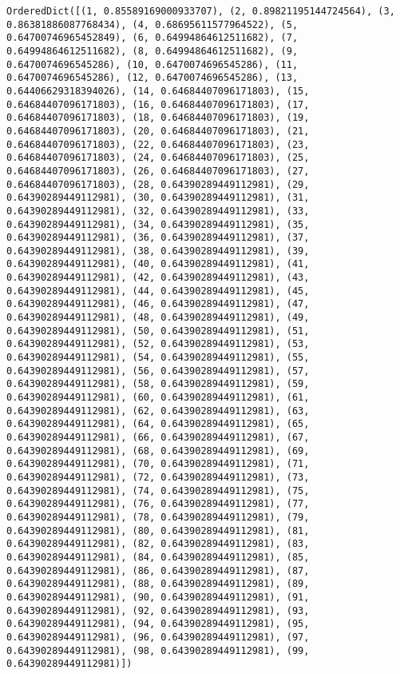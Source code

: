\documentclass[11pt]{article}
\begin{document}
\begin{Verbatim}[commandchars=\\\{\}]
OrderedDict([(1, 0.85589169000933707), (2, 0.89821195144724564), (3, 0.86381886087768434), (4, 0.68695611577964522), (5, 0.64700746965452849), (6, 0.64994864612511682), (7, 0.64994864612511682), (8, 0.64994864612511682), (9, 0.6470074696545286), (10, 0.6470074696545286), (11, 0.6470074696545286), (12, 0.6470074696545286), (13, 0.64406629318394026), (14, 0.64684407096171803), (15, 0.64684407096171803), (16, 0.64684407096171803), (17, 0.64684407096171803), (18, 0.64684407096171803), (19, 0.64684407096171803), (20, 0.64684407096171803), (21, 0.64684407096171803), (22, 0.64684407096171803), (23, 0.64684407096171803), (24, 0.64684407096171803), (25, 0.64684407096171803), (26, 0.64684407096171803), (27, 0.64684407096171803), (28, 0.64390289449112981), (29, 0.64390289449112981), (30, 0.64390289449112981), (31, 0.64390289449112981), (32, 0.64390289449112981), (33, 0.64390289449112981), (34, 0.64390289449112981), (35, 0.64390289449112981), (36, 0.64390289449112981), (37, 0.64390289449112981), (38, 0.64390289449112981), (39, 0.64390289449112981), (40, 0.64390289449112981), (41, 0.64390289449112981), (42, 0.64390289449112981), (43, 0.64390289449112981), (44, 0.64390289449112981), (45, 0.64390289449112981), (46, 0.64390289449112981), (47, 0.64390289449112981), (48, 0.64390289449112981), (49, 0.64390289449112981), (50, 0.64390289449112981), (51, 0.64390289449112981), (52, 0.64390289449112981), (53, 0.64390289449112981), (54, 0.64390289449112981), (55, 0.64390289449112981), (56, 0.64390289449112981), (57, 0.64390289449112981), (58, 0.64390289449112981), (59, 0.64390289449112981), (60, 0.64390289449112981), (61, 0.64390289449112981), (62, 0.64390289449112981), (63, 0.64390289449112981), (64, 0.64390289449112981), (65, 0.64390289449112981), (66, 0.64390289449112981), (67, 0.64390289449112981), (68, 0.64390289449112981), (69, 0.64390289449112981), (70, 0.64390289449112981), (71, 0.64390289449112981), (72, 0.64390289449112981), (73, 0.64390289449112981), (74, 0.64390289449112981), (75, 0.64390289449112981), (76, 0.64390289449112981), (77, 0.64390289449112981), (78, 0.64390289449112981), (79, 0.64390289449112981), (80, 0.64390289449112981), (81, 0.64390289449112981), (82, 0.64390289449112981), (83, 0.64390289449112981), (84, 0.64390289449112981), (85, 0.64390289449112981), (86, 0.64390289449112981), (87, 0.64390289449112981), (88, 0.64390289449112981), (89, 0.64390289449112981), (90, 0.64390289449112981), (91, 0.64390289449112981), (92, 0.64390289449112981), (93, 0.64390289449112981), (94, 0.64390289449112981), (95, 0.64390289449112981), (96, 0.64390289449112981), (97, 0.64390289449112981), (98, 0.64390289449112981), (99, 0.64390289449112981)])

\end{Verbatim}
\end{document}
